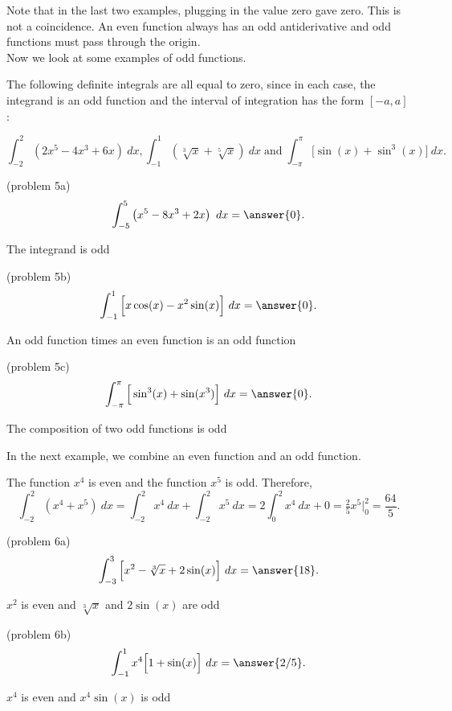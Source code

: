 \documentclass[handout]{ximera}
\begin{document}
Note that in the last two examples, plugging in the value zero gave zero.  This is not a coincidence.
An even function always has an odd antiderivative and odd functions must pass through the origin.\\
Now we look at some examples of odd functions.

\begin{example}[example 5]
The following definite integrals are all equal to zero, since in each case, the integrand is an odd function and the 
interval of integration has the form $[-a, a]$:

\[\int_{-2}^2 \left(2x^5 - 4x^3 + 6x \right)\ dx, \int_{-1}^1 \left(\sqrt[3] x + \sqrt[5]x\right) \ dx  \; \text{and} \; \int_{-\pi}^\pi \Big[\sin(x) + \sin^3(x)\Big] \ dx.\]
\end{example}

\begin{problem}(problem 5a)
\[\int_{-5}^5 \left(x^5 - 8x^3 +2x \right) \ dx =\answer {0}.\]
\begin{hint}
The integrand is odd
\end{hint}
\end{problem}

\begin{problem}(problem 5b)
\[\int_{-1}^1 \Big[x\cos(x) - x^2\sin(x) \Big] \ dx =\answer {0}.\]
\begin{hint}
An odd function times an even function is an odd function
\end{hint}
\end{problem}

\begin{problem}(problem 5c)
\[\int_{-\pi}^\pi \Big[\sin^3(x) + \sin(x^3)\Big] \ dx =\answer {0}.\]
\begin{hint}
The composition of two odd functions is odd
\end{hint}
\end{problem}


In the next example, we combine an even function and an odd function.

\begin{example}[example 6]
The function $x^4$ is even and the function $x^5$ is odd.  Therefore,
\[\int_{-2}^2 (x^4 + x^5) \ dx = \int_{-2}^2 x^4 \ dx + \int_{-2}^2 x^5 \ dx = 2\int_0^2 x^4 \ dx + 0 = \tfrac{2}{5}x^5\Bigg|_0^2 = \frac{64}{5}.\]
\end{example}

\begin{problem}(problem 6a)
\[\int_{-3}^3 \Big[x^2 - \sqrt[3]x +2\sin(x) \Big] \ dx =\answer {18}.\]
\begin{hint}
$x^2$ is even and $\sqrt[3]x$ and $2\sin(x)$ are odd
\end{hint}
\end{problem}

\begin{problem}(problem 6b)
\[\int_{-1}^{1} x^4\Big[1 + \sin(x)\Big] \ dx =\answer {2/5}.\]
\begin{hint}
$x^4$ is even and $x^4\sin(x)$ is odd
\end{hint}
\end{problem}
\end{document}
